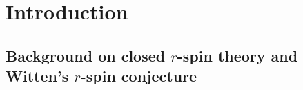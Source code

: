 \documentclass[11pt]{amsart}
\theoremstyle{definition}
\theoremstyle{remark}
\newcommand{\<}{\left<}
\renewcommand{\>}{\right>}
\numberwithin{equation}{section}
\begin{document}
\begin{abstract}
We %
prove that the open $g=1$ potential equals, after a coordinate change, to the $g=1$ part of the Gelfand--Dikii wave function, thus confirming a conjecture %
of \cite{BCT3}.
We %
also prove that our $g=1$ intersection numbers satisfy a $g=1$ recursion, also %
predicted in \cite{BCT3,gomez2021open}. This %
recursion is the $g=1$ analogue of Solomon's famous $g=0$ Open WDVV equation \cite{sol_owdvv}, with descendents, and is also the universal $g=1$ recursion for $F$-Cohomological field theories \cite{alexandrov2023construction}.
Again, this is first geometric construction which is not the $g=1$ sector %
of \cite{PST14,Tes15}, proven %
to satisfy this universal %
recursion.
\end{abstract}

\maketitle

\setcounter{tocdepth}{1}
\tableofcontents

\section{Introduction}\label{sec intro}
\subsection{Background on closed $r$-spin theory and Witten's $r$-spin conjecture}
\end{document}
